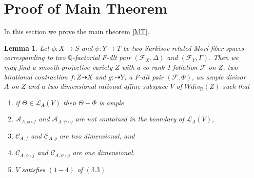 \documentclass[12pt]{amsart}%
\theoremstyle{plain}
\newtheorem{lemma}[theorem]{Lemma}
\theoremstyle{remark}
\theoremstyle{definition}
\newcommand{\<}{\leq}
\newcommand{\mbQ}{\mathbb{Q}}
\newcommand{\mbR}{\mathbb{R}}
\theoremstyle{definition}
\theoremstyle{definition}
\numberwithin{equation}{section}
\theoremstyle{remark}
\begin{document}
\section{Proof of Main Theorem}
In this section we prove the main theorem \ref{MT}. 
\begin{lemma}\label{FL}
    Let $\phi:X\rightarrow S$ and $\psi:Y\rightarrow T$ be two Sarkisov related Mori fiber spaces corresponding to two $\mbQ$-factorial F-dlt pair $(\mathcal{F}_X,\Delta)$ and $(\mathcal{F}_Y,\Gamma)$. Then we may find a smooth projective variety $Z$ with a co-rank 1 foliation $\mathcal{F}$ on $Z$, two birational contraction $f:Z\dashrightarrow X$ and $g:\dashrightarrow Y$, a F-dlt pair $(\mathcal{F},\Phi)$, an ample divisor $A$ on $Z$ and a two dimensional rational affine subspace $V$ of $Wdiv_{\mbR}(Z)$ such that 
    \begin{enumerate}
        \item if $\Theta\in \mathcal{L}_A(V)$ then $\Theta-\Phi$ is ample
        \item $\mathcal{A}_{A,\phi\circ f}$ and $\mathcal{A}_{A,\psi\circ g}$ are not contained in the boundary of $\mathcal{L}_A(V)$,
        \item $\mathcal{C}_{A,f}$ and $\mathcal{C}_{A,g}$ are two dimensional, and 
        \item $\mathcal{C}_{A,\phi\circ f}$ and $\mathcal{C}_{A,\psi\circ g}$ are one dimensional.
        \item $V$ satisfies $(1-4)$ of $(3.3)$.
        
    \end{enumerate}
\end{lemma}
\end{document}
